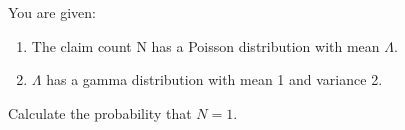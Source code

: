  You are given:
\begin{enumerate}
\item The claim count N has a Poisson distribution with mean $\Lambda$.
\item $\Lambda$ has a gamma distribution with mean 1 and variance 2.
\end{enumerate}
\bigskip

Calculate the probability that $N = 1$.

